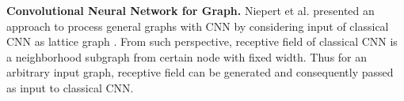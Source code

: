 \textbf{Convolutional Neural Network for Graph.}
Niepert et al. presented an approach to process general graphs with CNN by considering input of classical CNN as lattice graph \cite{niepert2016learning}.
From such perspective, receptive field of classical CNN is a neighborhood subgraph from certain node with fixed width.
Thus for an arbitrary input graph, receptive field can be generated and consequently passed as input to classical CNN.